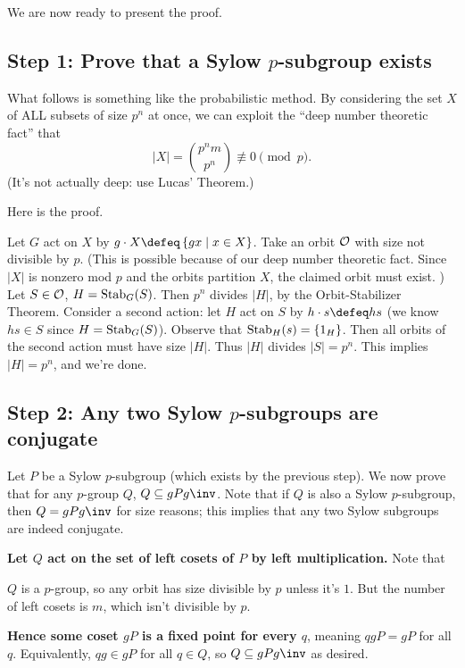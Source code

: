 We are now ready to present the proof.

\subsection*{Step 1: Prove that a Sylow $p$-subgroup exists}
What follows is something like the probabilistic method.
By considering the set $X$ of ALL subsets of size $p^n$ at once, we can exploit the ``deep number theoretic fact'' that 
\[ \left\lvert X \right\rvert = \binom{p^n m}{p^n} \not\equiv 0 \pmod p. \]
(It's not actually deep: use Lucas' Theorem.)

Here is the proof.
\begin{itemize}
	\ii Let $G$ act on $X$ by $g \cdot X \defeq \left\{ gx \mid x \in X \right\}$.
	\ii Take an orbit $\mathcal O$ with size not divisible by $p$.
	(This is possible because of our deep number theoretic fact.
	Since $\left\lvert X \right\rvert$ is nonzero mod $p$ and the orbits partition $X$, the claimed orbit must exist. )
	\ii Let $S \in \mathcal O$, $H = \operatorname{Stab}_G(S)$. Then $p^n$ divides $\left\lvert H \right\rvert$, by the Orbit-Stabilizer Theorem.
	\ii Consider a second action: let $H$ act on $S$ by 
	$h \cdot s \defeq hs$ (we know $hs \in S$ since $H = \operatorname{Stab}_G(S)$).
	\ii
	Observe that $\operatorname{Stab}_H(s) = \{1_H\}$.
	Then all orbits of the second action must have size $\left\lvert H \right\rvert$. Thus $\left\lvert H \right\rvert$ divides $\left\lvert S \right\rvert = p^n$.
	\ii This implies $\left\lvert H \right\rvert = p^n$, and we're done.
\end{itemize}


\subsection*{Step 2: Any two Sylow $p$-subgroups are conjugate}
Let $P$ be a Sylow $p$-subgroup (which exists by the previous step).
We now prove that for any $p$-group $Q$, $Q \subseteq gPg\inv$.
Note that if $Q$ is also a Sylow $p$-subgroup, then $Q = gPg\inv$ for size reasons;
this implies that any two Sylow subgroups are indeed conjugate.

\textbf{Let $Q$ act on the set of left cosets of $P$ by left multiplication.}
Note that
\begin{itemize}
	\ii $Q$ is a $p$-group, so any orbit has size divisible by $p$ unless it's $1$.
	\ii But the number of left cosets is $m$, which isn't divisible by $p$.
\end{itemize}
\textbf{Hence some coset $gP$ is a fixed point for every $q$}, meaning
$qgP = gP$ for all $q$.
Equivalently, $qg \in gP$ for all $q \in Q$, so $Q \subseteq gPg\inv$ as desired.


